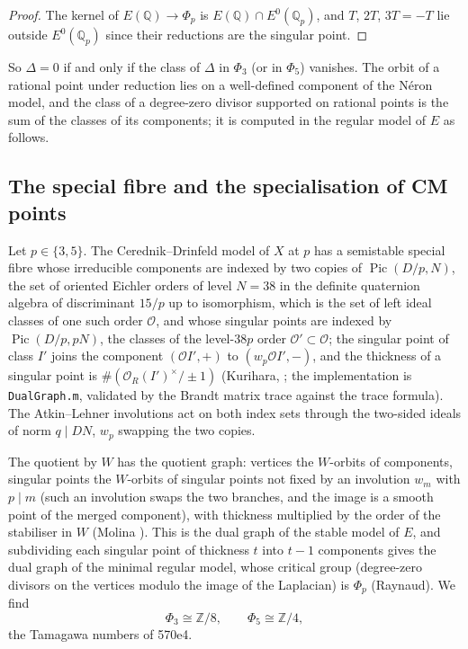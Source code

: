 \documentclass[11pt,reqno]{amsart}
\theoremstyle{plain}
\theoremstyle{definition}
\DeclareMathOperator{\Pic}{Pic}
\newcommand{\Q}{\mathbb{Q}}
\newcommand{\Z}{\mathbb{Z}}
\newcommand{\cO}{\mathcal{O}}
\begin{document}
\begin{proof}
The kernel of $E(\Q)\to\Phi_p$ is $E(\Q)\cap E^0(\Q_p)$, and $T$, $2T$, $3T=-T$ lie outside $E^0(\Q_p)$ since
their reductions are the singular point.
\end{proof}

So $\Delta=0$ if and only if the class of $\Delta$ in $\Phi_3$ (or in $\Phi_5$) vanishes. The orbit of a
rational point under reduction lies on a well-defined component of the N\'eron model, and the class of a
degree-zero divisor supported on rational points is the sum of the classes of its components; it is computed
in the regular model of $E$ as follows.

\subsection{The special fibre and the specialisation of CM points}\label{sec:spec}
Let $p\in\{3,5\}$. The Cerednik--Drinfeld model of $X$ at $p$ has a semistable special fibre whose
irreducible components are indexed by two copies of $\Pic(D/p,N)$, the set of oriented Eichler orders of
level $N=38$ in the definite quaternion algebra of discriminant $15/p$ up to isomorphism, which is the set
of left ideal classes of one such order $\cO$, and whose singular points are indexed by $\Pic(D/p,pN)$, the
classes of the level-$38p$ order $\cO'\subset\cO$; the singular point of class $I'$ joins the component
$(\cO I',+)$ to $(w_p\cO I',-)$, and the thickness of a singular point is $\#(\cO_R(I')^\times/\pm1)$
(Kurihara, \cite{kurihara}; the implementation is \texttt{DualGraph.m}, validated by the Brandt matrix
trace against the trace formula). The Atkin--Lehner involutions act on both index sets through the two-sided
ideals of norm $q\mid DN$, $w_p$ swapping the two copies.

The quotient by $W$ has the quotient graph: vertices the $W$-orbits of components, singular points the
$W$-orbits of singular points not fixed by an involution $w_m$ with $p\mid m$ (such an involution swaps the
two branches, and the image is a smooth point of the merged component), with thickness multiplied by the
order of the stabiliser in $W$ (Molina \cite[\S10.1]{molinahyp}). This is the dual graph of the stable
model of $E$, and subdividing each singular point of thickness $t$ into $t-1$ components gives the dual
graph of the minimal regular model, whose critical group (degree-zero divisors on the vertices modulo the
image of the Laplacian) is $\Phi_p$ (Raynaud). We find
\[
\Phi_3\cong\Z/8,\qquad \Phi_5\cong\Z/4,
\]
the Tamagawa numbers of 570e4.
\end{document}
